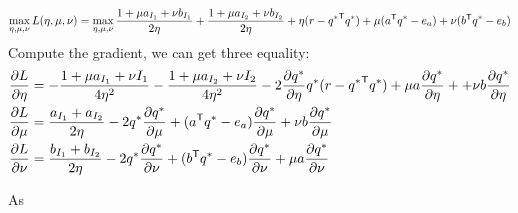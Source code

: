 \begin{equation}
\max_{\eta,\mu,\nu}  L(\eta,\mu,\nu) = \max_{\eta,\mu,\nu} \frac{1+\mu a_{I_1} + \nu b_{I_1}}{2\eta}  +\frac{1+\mu a_{I_2} + \nu b_{I_2}}{2\eta}+ \eta(r - {q^{*}}^{\mathsf T}q^{*} )+\mu( a^{\mathsf T}q^{*} - e_a ) + \nu( b^{\mathsf T}q^{*} - e_b )
\end{equation}
Compute the gradient, we can get three equality:
\begin{equation}
\begin{split} 
\frac{\partial L}{\partial \eta} &= -\frac{1+\mu a_{I_1} + \nu {I_1}}{4\eta^2} -  \frac{1+\mu a_{I_2} + \nu {I_2}}{4\eta^2} - 2\frac{\partial q^{*}}{\partial \eta}q^{*} (r - {q^{*}}^{\mathsf T}q^{*} )+\mu a \frac{\partial q^{*}}{\partial \eta} + +\nu b \frac{\partial q^{*}}{\partial \eta}\\
\frac{\partial L}{\partial \mu} &= \frac{a_{I_1} + a_{I_2}}{2\eta} - 2 q^{*}\frac{\partial q^{*}}{\partial \mu} +( a^{\mathsf T}q^{*} - e_a )\frac{\partial q^{*}}{\partial \mu} + \nu b \frac{\partial q^{*}}{\partial \mu} \\
\frac{\partial L}{\partial \nu} &= \frac{b_{I_1} + b_{I_2}}{2\eta} - 2 q^{*}\frac{\partial q^{*}}{\partial \nu} +( b^{\mathsf T}q^{*} - e_b )\frac{\partial q^{*}}{\partial \nu} + \mu a \frac{\partial q^{*}}{\partial \nu} 
 \end{split}
\end{equation}

As 


